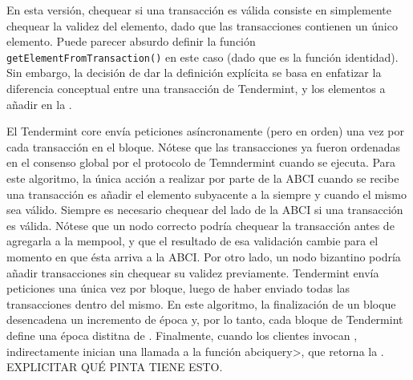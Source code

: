 %

En esta versión, chequear si una transacción es válida consiste en simplemente chequear
la validez del elemento, dado que las transacciones contienen un único elemento.
%
Puede parecer absurdo definir la función \texttt{getElementFromTransaction()}
en este caso (dado que es la función identidad). Sin embargo, la decisión de dar
la definición explícita se basa en enfatizar la diferencia conceptual entre una
transacción de Tendermint, y los elementos a añadir en la \setchain.
%

El Tendermint core envía peticiones \DeliverTx asíncronamente (pero en orden)
una vez por cada transacción en el bloque.
%
Nótese que las transacciones ya fueron ordenadas en el consenso global por el protocolo
de Temndermint cuando \DeliverTx se ejecuta.
%
Para este algoritmo, la única acción a realizar por parte de la ABCI cuando se recibe una
transacción es añadir el elemento subyacente a la \setchain siempre y cuando el mismo
sea válido.
%
Siempre es necesario chequear del lado de la ABCI si una transacción es válida.
%
Nótese que un nodo correcto podría chequear la transacción antes de agregarla a la
mempool,
y que el resultado de esa validación cambie para el momento en que ésta arriva a la
ABCI.
%
Por otro lado, un nodo bizantino podría añadir transacciones sin chequear
su validez previamente.
%
Tendermint envía peticiones \EndBlock una única vez por bloque, luego de haber
enviado todas las transacciones dentro del mismo.
%
En este algoritmo, la finalización de un bloque desencadena un incremento de época
y, por lo tanto, cada bloque de Tendermint define una época distitna de \setchain.
%
Finalmente, cuando los clientes invocan \Get, indirectamente inician una llamada
a la función \<abciquery>, que retorna la \setchain. EXPLICITAR QUÉ PINTA TIENE ESTO.


